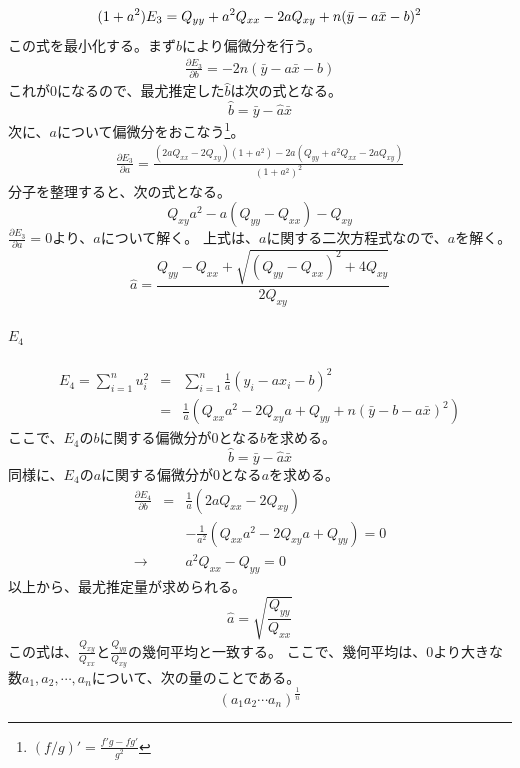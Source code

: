 \begin{equation*}
 (1+a^2)E_3 = Q_{yy}+a^2 Q_{xx}-2aQ_{xy}+n(\bar{y}-a\bar{x}-b)^2 \\
\end{equation*}
この式を最小化する。まず$b$により偏微分を行う。
\begin{eqnarray*}
 \frac{\partial E_3}{\partial b} = -2n(\bar{y}-a\bar{x}-b)
\end{eqnarray*}
これが$0$になるので、最尤推定した$\hat{b}$は次の式となる。
\begin{equation*}
 \hat{b} = \bar{y}-\hat{a}\bar{x}
\end{equation*}
次に、$a$について偏微分をおこなう\footnote{ $(f/g)'= \frac{f'g-fg'}{g^2}$ }。
\begin{eqnarray*}
\frac{\partial E_3}{\partial a} = \frac{(2aQ_{xx}-2Q_{xy})(1+a^2)-2a(Q_{yy}+a^2Q_{xx}-2aQ_{xy})}{(1+a^2)^2}
\end{eqnarray*}
分子を整理すると、次の式となる。
\begin{equation*}
 Q_{xy}a^2-a(Q_{yy}-Q_{xx})-Q_{xy}
\end{equation*}
$\frac{\partial E_3}{\partial a} =0$より、$a$について解く。
上式は、$a$に関する二次方程式なので、$a$を解く。
\begin{equation*}
 \hat{a} = \frac{Q_{yy}-Q_{xx}+\sqrt{(Q_{yy}-Q_{xx})^2+4Q_{xy}}}{2Q_{xy}}
\end{equation*}




\paragraph{$E_4$}
\begin{eqnarray*}
 E_4=\sum_{i=1}^n u_i^2 &=& \sum_{i=1}^n \frac{1}{a}(y_i-a x_i-b)^2 \\
 &=& \frac{1}{a}(Q_{xx}a^2-2Q_{xy}a+Q_{yy}+n(\bar{y}-b-a\bar{x})^2)
\end{eqnarray*}
ここで、$E_4$の$b$に関する偏微分が$0$となる$b$を求める。
\begin{equation*}
 \hat{b} = \bar{y}-\hat{a}\bar{x}
\end{equation*}
同様に、$E_4$の$a$に関する偏微分が$0$となる$a$を求める。
\begin{eqnarray*}
 \frac{\partial E_4}{\partial b} &=& \frac{1}{a}(2aQ_{xx}-2Q_{xy})\\
&& -\frac{1}{a^2}(Q_{xx}a^2-2Q_{xy}a+Q_{yy}) = 0 \\
\rightarrow && a^2 Q_{xx}-Q_{yy} = 0
\end{eqnarray*}
以上から、最尤推定量が求められる。
\begin{equation*}
 \hat{a}= \sqrt{\frac{Q_{yy}}{Q_{xx}}}
\end{equation*}
この式は、$\frac{Q_{xy}}{Q_{xx}}$と$\frac{Q_{yy}}{Q_{xy}}$の幾何平均と一致する。
ここで、幾何平均は、$0$より大きな数$a_1,a_2,\cdots,a_n$について、次の量のことである。
\begin{equation*}
 (a_1a_2\cdots a_n)^{\frac{1}{n}}
\end{equation*}

